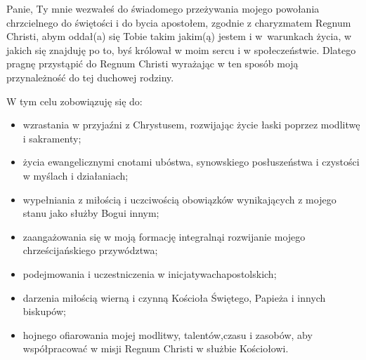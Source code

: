 ﻿\documentclass[9pt,twoside]{extarticle}
\begin{document}
\clearpage 


\begin{flushleft}
{\hnr{}}


\end{flushleft}


Panie, Ty mnie wezwałeś do świadomego przeżywania mojego powołania chrzcielnego do świętości i do bycia apostołem, zgodnie z charyzmatem Regnum Christi, abym oddał(a) się Tobie takim jakim(ą) jestem i w~warunkach życia, w jakich się znajduję po to, byś królował w moim sercu i w społeczeństwie. Dlatego pragnę przystąpić do Regnum Christi wyrażając w ten sposób moją przynależność do tej duchowej rodziny.






W tym celu zobowiązuję się do:
\begin{itemize}
\item wzrastania w przyjaźni z Chrystusem, rozwijając życie łaski poprzez modlitwę i sakramenty;
\item życia ewangelicznymi cnotami ubóstwa, synowskiego posłuszeństwa i czystości w myślach i działaniach;
\item wypełniania z miłością i uczciwością obowiązków wynikających z mojego stanu jako służby Bogu\linebreak i innym;
\item zaangażowania się w moją formację integralną\linebreak i rozwijanie mojego chrześcijańskiego przywództwa;
\item podejmowania i uczestniczenia w inicjatywach\linebreak apostolskich;
\item darzenia miłością wierną i czynną Kościoła Świętego, Papieża i innych
biskupów;
\item hojnego ofiarowania mojej modlitwy, talentów,\linebreak czasu i zasobów, aby współpracować w misji Regnum Christi w służbie Kościołowi.
\end{itemize}
\end{document}
